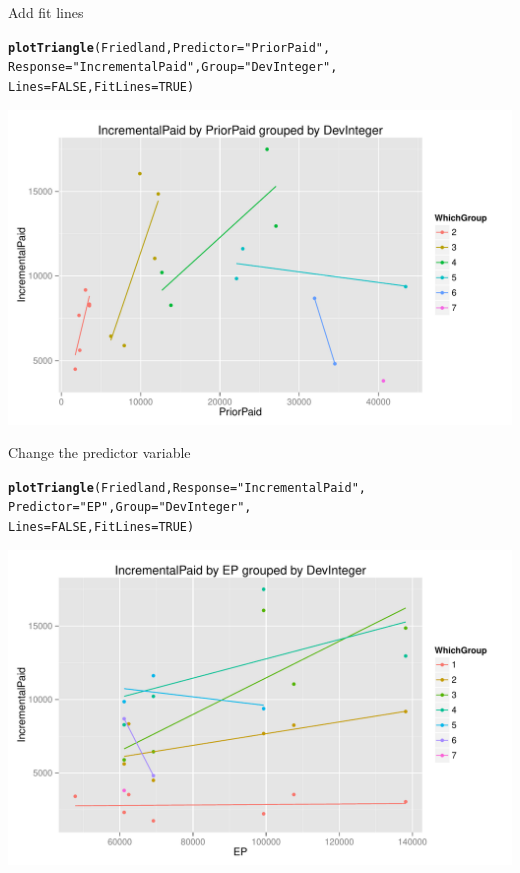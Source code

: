 \documentclass[xcolor=dvipsnames]{beamer}\usepackage{graphicx, color}
\makeatletter
\def\maxwidth{ %
  \ifdim\Gin@nat@width>\linewidth
    \linewidth
  \else
    \Gin@nat@width
  \fi
}
\newcommand{\hlfunctioncall}[1]{\textcolor[rgb]{0.501960784313725,0,0.329411764705882}{\textbf{#1}}}%
\newcommand{\hlstring}[1]{\textcolor[rgb]{0.6,0.6,1}{#1}}%
\newenvironment{kframe}{%
 \def\at@end@of@kframe{}%
 \ifinner\ifhmode%
  \def\at@end@of@kframe{\end{minipage}}%
  \begin{minipage}{\columnwidth}%
 \fi\fi%
 \def\FrameCommand##1{\hskip\@totalleftmargin \hskip-\fboxsep
 \colorbox{shadecolor}{##1}\hskip-\fboxsep
     \hskip-\linewidth \hskip-\@totalleftmargin \hskip\columnwidth}%
 \MakeFramed {\advance\hsize-\width
   \@totalleftmargin\z@ \linewidth\hsize
   \@setminipage}}%
 {\par\unskip\endMakeFramed%
 \at@end@of@kframe}
\newenvironment{knitrout}{}{} %
\makeatother
\begin{document}
\begin{frame}[fragile]{Add fit lines}
\begin{knitrout}
\color{fgcolor}\begin{kframe}
\begin{alltt}
\hlfunctioncall{plotTriangle}(Friedland, Predictor = \hlstring{"PriorPaid"}, 
    Response = \hlstring{"IncrementalPaid"}, Group = \hlstring{"DevInteger"}, 
    Lines = FALSE, FitLines = TRUE)
\end{alltt}
\end{kframe}
\includegraphics[width=\maxwidth]{figure/Friedland5} 

\end{knitrout}

\end{frame}

\begin{frame}[fragile]{Change the predictor variable}
\begin{knitrout}
\color{fgcolor}\begin{kframe}
\begin{alltt}
\hlfunctioncall{plotTriangle}(Friedland, Response = \hlstring{"IncrementalPaid"}, 
    Predictor = \hlstring{"EP"}, Group = \hlstring{"DevInteger"}, 
    Lines = FALSE, FitLines = TRUE)
\end{alltt}
\end{kframe}
\includegraphics[width=\maxwidth]{figure/Friedland4} 

\end{knitrout}

\end{frame}
\end{document}
